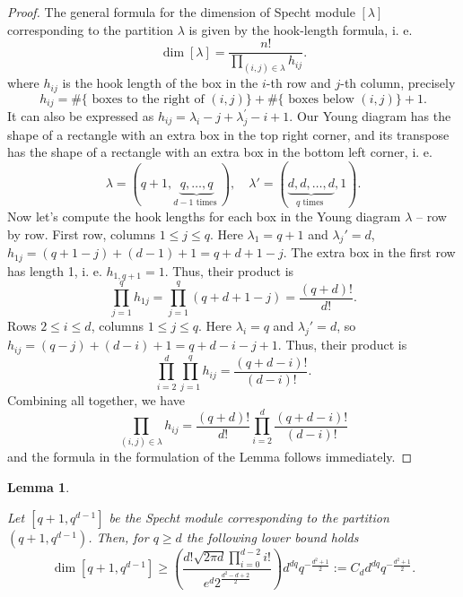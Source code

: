 \documentclass[10pt,twocolumn,superscriptaddress,aps,amsmath,amssymb,citeautoscript,floatfix,prx]{revtex4-2}
\theoremstyle{plain}
\theoremstyle{plain}
\theoremstyle{plain}
\theoremstyle{plain}
\theoremstyle{plain}
\theoremstyle{plain}
\theoremstyle{plain}
\newtheorem{smlemma}[smtheorem]{Lemma}
\theoremstyle{definition}
\theoremstyle{plain}
\begin{document}
\begin{appendix}
\begin{proof}
    The general formula for the dimension of Specht module $[\lambda]$ corresponding to the partition $\lambda$ is given by the hook-length formula, i. e.
    \[
        \operatorname{dim} [\lambda] = \frac{n!}{\prod_{(i, j) \in \lambda} h_{i j}} .
    \]
    where $h_{ij}$ is the hook length of the box in the $i$-th row and $j$-th column, precisely
    \[
        h_{i j}=\#\{\text { boxes to the right of }(i, j)\}+\#\{\text { boxes below }(i, j)\}+1 .
    \]
    It can also be expressed as
    $
        h_{i j}=\lambda_i-j+\lambda_j^{\prime}-i+1 .
    $
    Our Young diagram has the shape of a rectangle with an extra box in the top right corner, and its transpose 
    has the shape of a rectangle with an extra box in the bottom left corner, i. e.
    $$
        \lambda=(q+1, \underbrace{q, \ldots, q}_{d-1 \text { times }}), \quad \lambda'=(\underbrace{d, d, \ldots, d}_{q \text { times }}, 1).
    $$
    Now let's compute the hook lengths for each box in the Young diagram $\lambda$ -- row by row.
    First row, columns $1 \leq j \leq q$. Here $\lambda_1 = q+1$ and $\lambda_j'=d$, 
    $
        h_{1 j}=(q+1-j)+(d-1)+1=q+d+1-j.
    $
    The extra box in the first row has length 1, i. e. 
    $
        h_{1, q+1}=1.
    $
    Thus, their product is
    \[
        \prod_{j=1}^q h_{1 j}=\prod_{j=1}^q(q+d+1-j)=\frac{(q+d)!}{d!} .
    \]
    Rows $2 \leq i \leq d$, columns $1 \leq j \leq q$. Here $\lambda_i=q$ and $\lambda_j'=d$, so
    $
        h_{i j}=(q-j)+(d-i)+1=q+d-i-j+1 .
    $
    Thus, their product is
    \[
       \prod_{i=2}^d \prod_{j=1}^q h_{i j}=\frac{(q+d-i)!}{(d-i)!}.
    \]
    Combining all together, we have
    \[
        \prod_{(i, j) \in \lambda} h_{i j}=\frac{(q+d)!}{d!} \prod_{i=2}^d \frac{(q+d-i)!}{(d-i)!}
    \]
    and the formula in the formulation of the Lemma follows immediately.

\end{proof}

\begin{smlemma}\label{lem:dimension_bound}

Let $[q+1, q^{d-1}]$ be the Specht module corresponding to the partition $(q+1, q^{d-1})$. 
Then, for $q\geq d$ the following lower bound holds
\[
    \operatorname{dim} [q+1, q^{d-1}] \geq \left(\frac{d!\sqrt{2 \pi d}\prod_{i=0}^{d-2} i!}{e^d 2^{\frac{d^2-d+2}{2}}} \right) d^{d q} q^{-\frac{d^2+1}{2}} := C_d d^{d q} q^{-\frac{d^2+1}{2}}.
\]

\end{smlemma}


\end{appendix}
\end{document}

